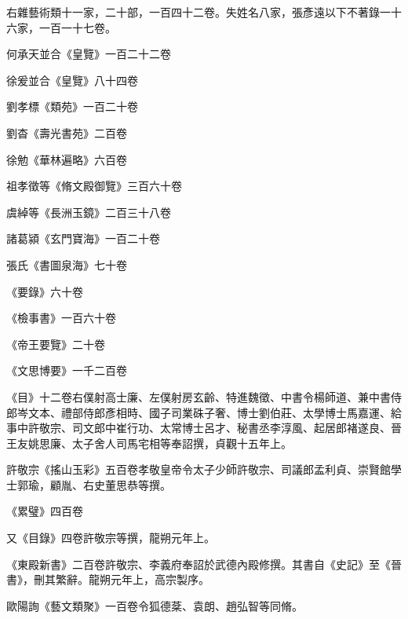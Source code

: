 \begin{pinyinscope}
 右雜藝術類十一家，二十部，一百四十二卷。失姓名八家，張彥遠以下不著錄一十六家，一百一十七卷。



 何承天並合《皇覽》一百二十二卷



 徐爰並合《皇覽》八十四卷



 劉孝標《類苑》一百二十卷



 劉杳《壽光書苑》二百卷



 徐勉《華林遍略》六百卷



 祖孝徵等《脩文殿御覽》三百六十卷



 虞綽等《長洲玉鏡》二百三十八卷



 諸葛潁《玄門寶海》一百二十卷



 張氏《書圖泉海》七十卷



 《要錄》六十卷



 《檢事書》一百六十卷



 《帝王要覽》二十卷



 《文思博要》一千二百卷



 《目》十二卷右僕射高士廉、左僕射房玄齡、特進魏徵、中書令楊師道、兼中書侍郎岑文本、禮部侍郎彥相時、國子司業硃子奢、博士劉伯莊、太學博士馬嘉運、給事中許敬宗、司文郎中崔行功、太常博士呂才、秘書丞李淳風、起居郎褚遂良、晉王友姚思廉、太子舍人司馬宅相等奉詔撰，貞觀十五年上。



 許敬宗《搖山玉彩》五百卷孝敬皇帝令太子少師許敬宗、司議郎孟利貞、崇賢館學士郭瑜，顧胤、右史董思恭等撰。



 《累璧》四百卷



 又《目錄》四卷許敬宗等撰，龍朔元年上。



 《東殿新書》二百卷許敬宗、李義府奉詔於武德內殿修撰。其書自《史記》至《晉書》，刪其繁辭。龍朔元年上，高宗製序。



 歐陽詢《藝文類聚》一百卷令狐德棻、袁朗、趙弘智等同脩。




\end{pinyinscope}
